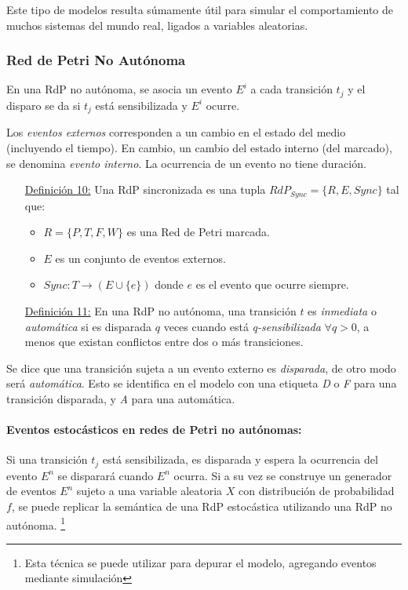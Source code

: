 Este tipo de modelos resulta súmamente útil para simular el comportamiento de
muchos sistemas del mundo real, ligados a variables aleatorias.

\subsubsection{Red de Petri No Autónoma}
En una RdP no autónoma, se asocia un evento $E^{i}$ a cada transición $t_{j}$ y
el disparo se da si $t_{j}$ está sensibilizada y $E^{i}$ ocurre.

Los \textit{eventos externos} corresponden a un cambio en el estado del medio
(incluyendo el tiempo). En cambio, un cambio del estado interno (del marcado),
se denomina \textit{evento interno}. La ocurrencia de un evento no tiene
duración. \cite{Hybrid_petri_nets}

\begin{itemize}
  \item [\underline{Definición 10:}] Una RdP sincronizada es una tupla
  $RdP_{Sync} = \{R, E, Sync\}$ tal que:
  \begin{itemize}
    \item $R =  \{P,T,F,W\}$ es una Red de Petri marcada.
    \item $E$ es un conjunto de eventos externos.
    \item $Sync : T \rightarrow (E \cup \{e\} ) $ donde $e$ es el evento
    que ocurre siempre.
  \end{itemize}
  \item [\underline{Definición 11:}] En una RdP no autónoma, una transición $t$
   es \textit{inmediata} o \textit{automática} si es disparada $q$ veces cuando
   está \textit{q-sensibilizada} $\forall q > 0$, a menos que existan conflictos
   entre dos o más transiciones.
\end{itemize}

Se dice que una transición sujeta a un evento externo es \textit{disparada}, de
otro modo será \textit{automática}. Esto se identifica en el modelo con una
etiqueta \textit{D} o \textit{F} para una transición disparada, y \textit{A}
para una automática.

\paragraph{Eventos estocásticos en redes de Petri no autónomas:}
Si una transición $t_{j}$ está sensibilizada, es disparada y espera la
ocurrencia del evento $E^{n}$ se disparará cuando $E^{n}$ ocurra.
Si a su vez se construye un generador de eventos $E^{n}$ sujeto a una variable
aleatoria $X$ con distribución de probabilidad $f$, se puede replicar la
semántica de una RdP estocástica utilizando una RdP no autónoma.
\footnote{Esta técnica se puede utilizar para depurar el modelo, agregando
eventos mediante simulación}

